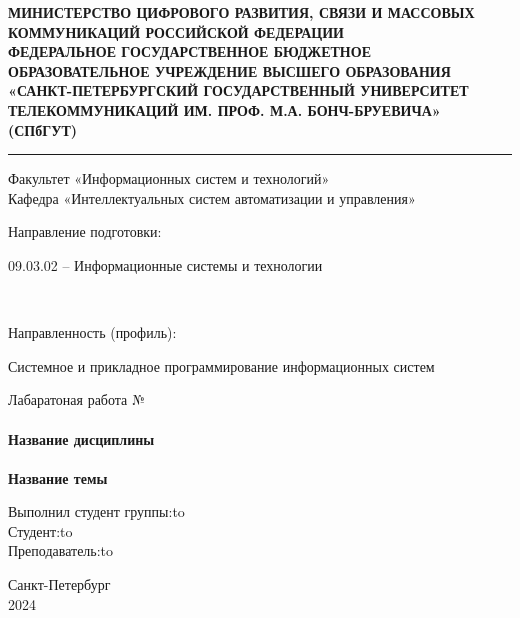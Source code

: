 \begin{center}
\bf{\large{МИНИСТЕРСТВО ЦИФРОВОГО РАЗВИТИЯ, СВЯЗИ И МАССОВЫХ КОММУНИКАЦИЙ РОССИЙСКОЙ ФЕДЕРАЦИИ}\\
\footnotesize{ФЕДЕРАЛЬНОЕ ГОСУДАРСТВЕННОЕ БЮДЖЕТНОЕ ОБРАЗОВАТЕЛЬНОЕ УЧРЕЖДЕНИЕ ВЫСШЕГО ОБРАЗОВАНИЯ}\\ 
\small{\textbf{«САНКТ-ПЕТЕРБУРГСКИЙ ГОСУДАРСТВЕННЫЙ УНИВЕРСИТЕТ ТЕЛЕКОММУНИКАЦИЙ ИМ. ПРОФ. М.А. БОНЧ-БРУЕВИЧА» (СПбГУТ)}}}\\

\par\noindent\rule{\textwidth}{0.5pt}

\vspace{2em}
Факультет «Информационных систем и технологий»\\
Кафедра «Интеллектуальных систем автоматизации и управления»\\
\vspace{3em}

\begin{minipage}{0.4\textwidth}
Направление подготовки: 
\end{minipage}
\hfill
\bigskip
\begin{minipage}{0.45\textwidth}
09.03.02 – Информационные системы и технологии
\end{minipage}\\

\begin{minipage}{0.4\textwidth}
Направленность (профиль): 
\end{minipage}
\hfill
\begin{minipage}{0.45\textwidth}
Системное и прикладное программирование информационных систем
\end{minipage}

\vspace{3em}

\large{Лабаратоная работа №}\\
\hfill \break 
\small \normalsize {}\\
\bf{Название дисциплины}\\
\hfill \break 
\normalsize {}\\
\bf{Название темы}\\
\end{center}

\vspace{4em}
 
\newbox{\lbox}
\newlength{\maxl}
\setlength{\maxl}{\wd\lbox}
\hfill\parbox{11cm}{
\hspace*{6cm}\hspace*{-6cm}Выполнил студент группы:\hfill\hbox to\\
\hspace*{5cm}\hspace*{-5cm}Студент:\hfill\hbox to\\
\hspace*{5cm}\hspace*{-5cm}Преподаватель:\hfill\hbox to\\
}

\hfill \break
\vspace*{\fill}
\begin{center} Санкт-Петербург\\2024\end{center}
\thispagestyle{empty}
